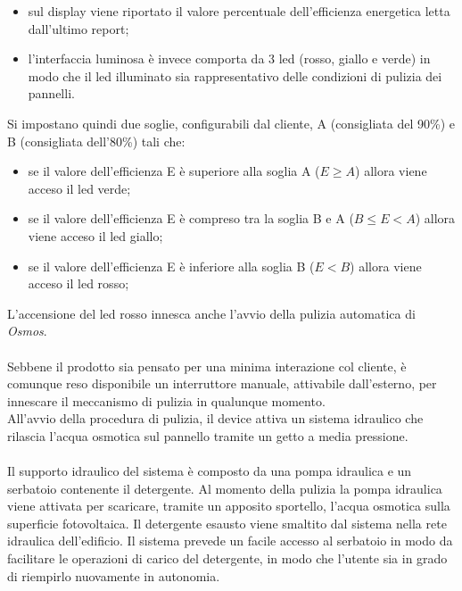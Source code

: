 \documentclass[a4paper, 12pt]{article}
\begin{document}
	\begin{itemize}
		\item sul display viene riportato il valore percentuale dell'efficienza energetica letta dall'ultimo report;
		\item l'interfaccia luminosa è invece comporta da 3 led (rosso, giallo e verde) in modo che il led illuminato sia rappresentativo delle condizioni di pulizia dei pannelli.
	\end{itemize}
	Si impostano quindi due soglie, configurabili dal cliente, A (consigliata del 90\%) e B (consigliata dell'80\%) tali che:
	\begin{itemize}
		\item se il valore dell'efficienza E è superiore alla soglia A ($E \ge A$) allora viene acceso il led verde;
		\item se il valore dell'efficienza E è compreso tra la soglia B e A ($B \le E < A$) allora viene acceso il led giallo;
		\item se il valore dell'efficienza E è inferiore alla soglia B ($E < B$) allora viene acceso il led rosso;
	\end{itemize}
	L'accensione del led rosso innesca anche l'avvio della pulizia automatica di \emph{Osmos}.\\\\
	Sebbene il prodotto sia pensato per una minima interazione col cliente, è comunque reso disponibile un interruttore manuale, attivabile dall'esterno, per innescare il meccanismo di pulizia in qualunque momento.\\
	All'avvio della procedura di pulizia, il device attiva un sistema idraulico che rilascia l'acqua osmotica sul pannello tramite un getto a media pressione.\\\\
	Il supporto idraulico del sistema è composto da una pompa idraulica e un serbatoio contenente il detergente. Al momento della pulizia la pompa idraulica viene attivata per scaricare, tramite un apposito sportello, l'acqua osmotica sulla superficie fotovoltaica. Il detergente esausto viene smaltito dal sistema nella rete idraulica dell'edificio.
	Il sistema prevede un facile accesso al serbatoio in modo da facilitare le operazioni di carico del detergente, in modo che l'utente sia in grado di riempirlo nuovamente in autonomia.
\end{document}
